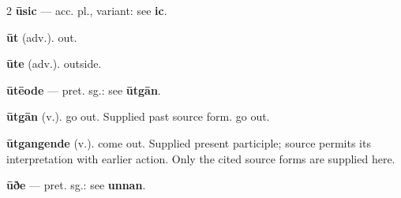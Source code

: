 \begin{multicols*}{2}
\textbf{ūsic} — acc. pl., variant: see \textbf{ic}.\par
\textbf{ūt} (adv.). out.\par
\textbf{ūte} (adv.). outside.\par
\textbf{ūtēode} — pret. sg.: see \textbf{ūtgān}.\par
\textbf{ūtgān} (v.). go out. Supplied past source form. go out.\par
\textbf{ūtgangende} (v.). come out. Supplied present participle; source permits its interpretation with earlier action. Only the cited source forms are supplied here.\par
\textbf{ūðe} — pret. sg.: see \textbf{unnan}.\par

\end{multicols*}
